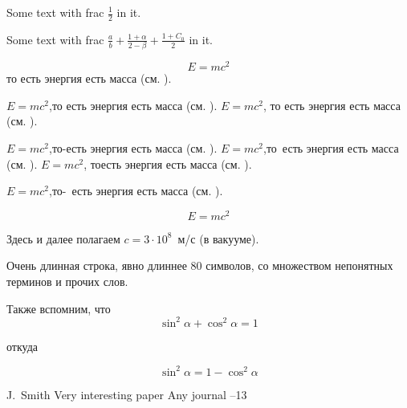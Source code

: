 \documentclass{article}
\begin{document}
Some text with frac $\frac{1}{2}$ in it.%

Some text with frac $\frac{a}{b}+\frac{1+\alpha}{2-\beta}+\frac{1+C_0}{2}$ in it.  %



\begin{equation}\label{eq1}
E=mc^2
\end{equation}
то есть энергия есть масса (см. \cite{Einstein}).


$E=mc^2$,то есть энергия есть масса (см. \cite{Einstein}).
$E=mc^2$, то есть энергия есть масса (см. \cite{Einstein}).

$E=mc^2$,то-есть энергия есть масса (см. \cite{Einstein}).
$E=mc^2$,то~есть энергия есть масса (см. \cite{Einstein}).
$E=mc^2$, тоесть энергия есть масса (см. \cite{Einstein}).

$E=mc^2$,то-~есть энергия есть масса (см. \cite{Einstein}).


$$E=mc^2$$

Здесь и далее полагаем $c=3\cdot10^8$~м/с (в вакууме).

Очень длинная строка, явно длиннее 80 символов, со множеством непонятных терминов и прочих слов.

Также вспомним, что
\begin{equation*}
\sin^2 \alpha + \cos^2 \alpha = 1
\end{equation*}

откуда

\begin{equation*}
\sin^2 \alpha = 1 - \cos^2 \alpha
\end{equation*}

\begin{thebibliography}{99}


\by J.~Smith
\paper Very interesting paper
\jour Any journal
--13


\end{thebibliography}
\end{document}

